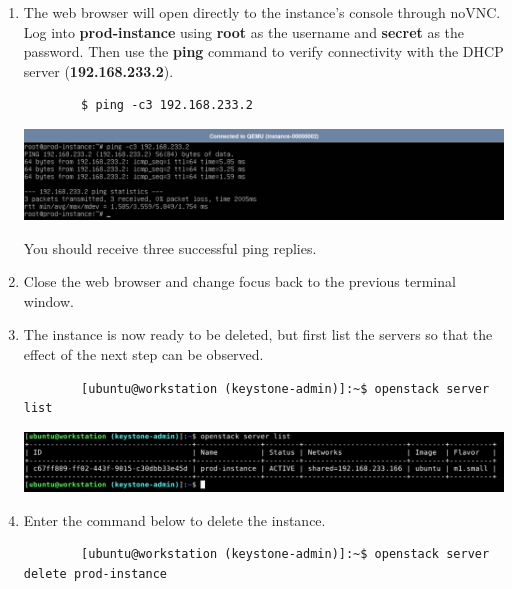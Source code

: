 \documentclass[letterpaper, 12pt]{article}
\begin{document}
\begin{enumerate}
    \item The web browser will open directly to the instance's console through noVNC. Log into \textbf{prod-instance} using \textbf{root} as the username and \textbf{secret} as the password. Then use the \textbf{ping} command to verify connectivity with the DHCP server (\textbf{192.168.233.2}).
    \begin{lstlisting}
        $ ping -c3 192.168.233.2
    \end{lstlisting}

    \begin{center}
        \includegraphics[width=\linewidth]{images/part2/step11.png}
    \end{center}

    \begin{notebox}
        You should receive three successful ping replies.
    \end{notebox}

    \item Close the web browser and change focus back to the previous terminal window.

    \item The instance is now ready to be deleted, but first list the servers so that the effect of the next step can be observed.
    \begin{lstlisting}
        [ubuntu@workstation (keystone-admin)]:~$ openstack server list
    \end{lstlisting}

    \begin{center}
        \includegraphics[width=\linewidth]{images/part2/step13.png}
    \end{center}

    \item Enter the command below to delete the instance.
    \begin{lstlisting}
        [ubuntu@workstation (keystone-admin)]:~$ openstack server delete prod-instance
    \end{lstlisting}


\end{enumerate}
\end{document}
